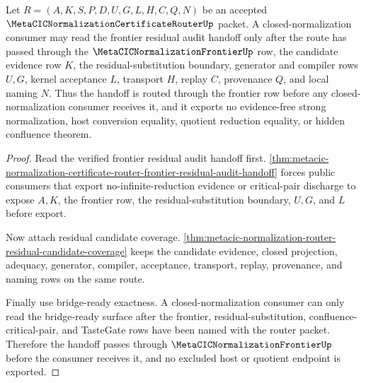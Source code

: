 \begin{theorem}
\label{thm:metacic-normalization-router-frontier-audit-handoff}
Let $R=(A,K,S,P,D,U,G,L,H,C,Q,N)$ be an accepted $\MetaCICNormalizationCertificateRouterUp$ packet. A closed-normalization consumer may read the frontier residual audit handoff only after the route has passed through the $\MetaCICNormalizationFrontierUp$ row, the candidate evidence row $K$, the residual-substitution boundary, generator and compiler rows $U,G$, kernel acceptance $L$, transport $H$, replay $C$, provenance $Q$, and local naming $N$. Thus the handoff is routed through the frontier row before any closed-normalization consumer receives it, and it exports no evidence-free strong normalization, host conversion equality, quotient reduction equality, or hidden confluence theorem.
\end{theorem}
\begin{proof}
Read the verified frontier residual audit handoff first. \autoref{thm:metacic-normalization-certificate-router-frontier-residual-audit-handoff} forces public consumers that export no-infinite-reduction evidence or critical-pair discharge to expose $A,K$, the frontier row, the residual-substitution boundary, $U,G$, and $L$ before export.

Now attach residual candidate coverage. \autoref{thm:metacic-normalization-router-residual-candidate-coverage} keeps the candidate evidence, closed projection, adequacy, generator, compiler, acceptance, transport, replay, provenance, and naming rows on the same route.

Finally use bridge-ready exactness. A closed-normalization consumer can only read the bridge-ready surface after the frontier, residual-substitution, confluence-critical-pair, and TasteGate rows have been named with the router packet. Therefore the handoff passes through $\MetaCICNormalizationFrontierUp$ before the consumer receives it, and no excluded host or quotient endpoint is exported.
\end{proof}



